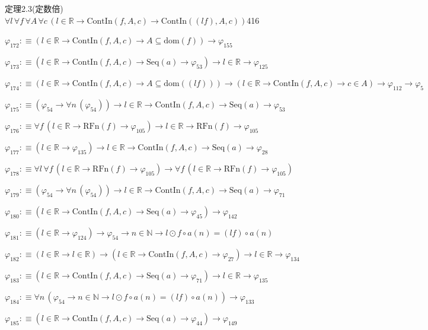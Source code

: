 \begin{fullproof}{定理2.3(定数倍)}{$\forall l\,\forall f\,\forall A\,\forall c\,(l \in \mathbb{R} \to \mathrm{ContIn}(f,A,c) \to \mathrm{ContIn}((l f),A,c))$}{416}
\begin{abbrevlist}
\item $\varphi_{172} :\equiv (l \in \mathbb{R} \to \mathrm{ContIn}(f,A,c) \to A \subseteq \mathrm{dom}(f)) \to \varphi_{155}$
\item $\varphi_{173} :\equiv (l \in \mathbb{R} \to \mathrm{ContIn}(f,A,c) \to \mathrm{Seq}(a) \to \varphi_{53}) \to l \in \mathbb{R} \to \varphi_{125}$
\item $\varphi_{174} :\equiv (l \in \mathbb{R} \to \mathrm{ContIn}(f,A,c) \to A \subseteq \mathrm{dom}((l f))) \to (l \in \mathbb{R} \to \mathrm{ContIn}(f,A,c) \to c \in A) \to \varphi_{112} \to \varphi_{5}$
\item $\varphi_{175} :\equiv (\varphi_{54} \to \forall n\,(\varphi_{54})) \to l \in \mathbb{R} \to \mathrm{ContIn}(f,A,c) \to \mathrm{Seq}(a) \to \varphi_{53}$
\item $\varphi_{176} :\equiv \forall f\,(l \in \mathbb{R} \to \mathrm{RFn}(f) \to \varphi_{105}) \to l \in \mathbb{R} \to \mathrm{RFn}(f) \to \varphi_{105}$
\item $\varphi_{177} :\equiv (l \in \mathbb{R} \to \varphi_{135}) \to l \in \mathbb{R} \to \mathrm{ContIn}(f,A,c) \to \mathrm{Seq}(a) \to \varphi_{28}$
\item $\varphi_{178} :\equiv \forall l\,\forall f\,(l \in \mathbb{R} \to \mathrm{RFn}(f) \to \varphi_{105}) \to \forall f\,(l \in \mathbb{R} \to \mathrm{RFn}(f) \to \varphi_{105})$
\item $\varphi_{179} :\equiv (\varphi_{54} \to \forall n\,(\varphi_{54})) \to l \in \mathbb{R} \to \mathrm{ContIn}(f,A,c) \to \mathrm{Seq}(a) \to \varphi_{71}$
\item $\varphi_{180} :\equiv (l \in \mathbb{R} \to \mathrm{ContIn}(f,A,c) \to \mathrm{Seq}(a) \to \varphi_{45}) \to \varphi_{142}$
\item $\varphi_{181} :\equiv (l \in \mathbb{R} \to \varphi_{124}) \to \varphi_{54} \to n \in \mathbb{N} \to l \odot f \circ a(n) = (l f) \circ a(n)$
\item $\varphi_{182} :\equiv (l \in \mathbb{R} \to l \in \mathbb{R}) \to (l \in \mathbb{R} \to \mathrm{ContIn}(f,A,c) \to \varphi_{27}) \to l \in \mathbb{R} \to \varphi_{134}$
\item $\varphi_{183} :\equiv (l \in \mathbb{R} \to \mathrm{ContIn}(f,A,c) \to \mathrm{Seq}(a) \to \varphi_{71}) \to l \in \mathbb{R} \to \varphi_{135}$
\item $\varphi_{184} :\equiv \forall n\,(\varphi_{54} \to n \in \mathbb{N} \to l \odot f \circ a(n) = (l f) \circ a(n)) \to \varphi_{133}$
\item $\varphi_{185} :\equiv (l \in \mathbb{R} \to \mathrm{ContIn}(f,A,c) \to \mathrm{Seq}(a) \to \varphi_{44}) \to \varphi_{149}$

\end{abbrevlist}
\end{fullproof}
